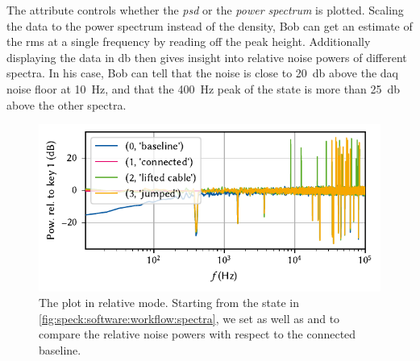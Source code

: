 The attribute  controls whether the \emph{\acrlong{psd}} or the \emph{power spectrum} is plotted.
Scaling the data to the power spectrum instead of the density, Bob can get an estimate of the \gls{rms} at a single frequency by reading off the peak height.
Additionally displaying the data in \unit{\decibel} then gives insight into relative noise powers of different spectra.
In his case, Bob can tell that the \oneoverf noise is close to \qty{20}{\decibel} above the \gls{daq} noise floor at \qty{10}{\hertz}, and that the \qty{400}{\hertz} peak of the  state is more than \qty{25}{\decibel} above the other spectra.

\begin{figure}
    \centering
    \includegraphics{img/pdf/spectrometer/workflow_db}
    \caption[]{
        The \pyspeck plot in relative mode.
        Starting from the state in \cref{fig:speck:software:workflow:spectra}, we set  as well as  and  to compare the relative noise powers with respect to the connected baseline.
    }
    \label{fig:speck:software:workflow:db}
\end{figure}

